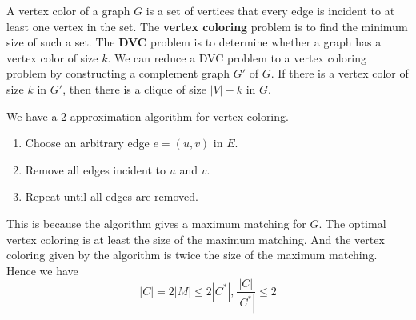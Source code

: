 \documentclass[a4paper,12pt]{article}
\begin{document}
A vertex color of a graph $G$ is a set of vertices that every edge is incident to at least one vertex in the set.
The \textbf{vertex coloring} problem is to find the minimum size of such a set.
The \textbf{DVC} problem is to determine whether a graph has a vertex color of size $k$.
We can reduce a DVC problem to a vertex coloring problem by constructing a complement graph $G'$ of $G$.
If there is a vertex color of size $k$ in $G'$, then there is a clique of size $|V| - k$ in $G$.

We have a 2-approximation algorithm for vertex coloring.
\begin{enumerate}
	\item Choose an arbitrary edge $e = (u,v)$ in $E$.
	\item Remove all edges incident to $u$ and $v$.
	\item Repeat until all edges are removed.
\end{enumerate}
This is because the algorithm gives a maximum matching for $G$.
The optimal vertex coloring is at least the size of the maximum matching.
And the vertex coloring given by the algorithm is twice the size of the maximum matching.
Hence we have
\begin{equation*}
	|C| = 2|M| \leq 2|C^*|, \frac{|C|}{|C^*|} \leq 2
\end{equation*}
\end{document}
